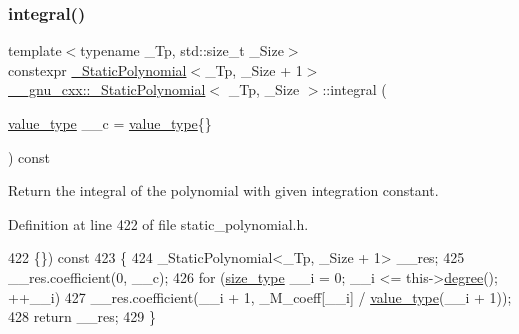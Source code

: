 \subsubsection{\texorpdfstring{integral()}{integral()}}
{\footnotesize\ttfamily template$<$typename \+\_\+\+Tp, std\+::size\+\_\+t \+\_\+\+Size$>$ \\
constexpr \hyperlink{class____gnu__cxx_1_1__StaticPolynomial}{\+\_\+\+Static\+Polynomial}$<$\+\_\+\+Tp, \+\_\+\+Size + 1$>$ \hyperlink{class____gnu__cxx_1_1__StaticPolynomial}{\+\_\+\+\_\+gnu\+\_\+cxx\+::\+\_\+\+Static\+Polynomial}$<$ \+\_\+\+Tp, \+\_\+\+Size $>$\+::integral (\begin{DoxyParamCaption}\item[{\hyperlink{class____gnu__cxx_1_1__StaticPolynomial_aad5f3d6d5876b6926b30724aeac649d6}{value\+\_\+type}}]{\+\_\+\+\_\+c = {\ttfamily \hyperlink{class____gnu__cxx_1_1__StaticPolynomial_aad5f3d6d5876b6926b30724aeac649d6}{value\+\_\+type}\{\}} }\end{DoxyParamCaption}) const\hspace{0.3cm}{\ttfamily [inline]}}

Return the integral of the polynomial with given integration constant. 

Definition at line 422 of file static\+\_\+polynomial.\+h.


\begin{DoxyCode}
422                                           \{\}) \textcolor{keyword}{const}
423       \{
424         \_StaticPolynomial<\_Tp, \_Size + 1> \_\_res;
425         \_\_res.coefficient(0, \_\_c);
426         \textcolor{keywordflow}{for} (\hyperlink{class____gnu__cxx_1_1__StaticPolynomial_a0cc0aa4adab35686ef2474e07f511ff9}{size\_type} \_\_i = 0; \_\_i <= this->\hyperlink{class____gnu__cxx_1_1__StaticPolynomial_a5977dac3a84e8a43f3e9da28b62ca46a}{degree}(); ++\_\_i)
427           \_\_res.coefficient(\_\_i + 1, \_M\_coeff[\_\_i] / \hyperlink{class____gnu__cxx_1_1__StaticPolynomial_aad5f3d6d5876b6926b30724aeac649d6}{value\_type}(\_\_i + 1));
428         \textcolor{keywordflow}{return} \_\_res;
429       \}
\end{DoxyCode}
\mbox{\label{class____gnu__cxx_1_1__StaticPolynomial_a208f6efc6cb281333244121edb6d0a21}} 
